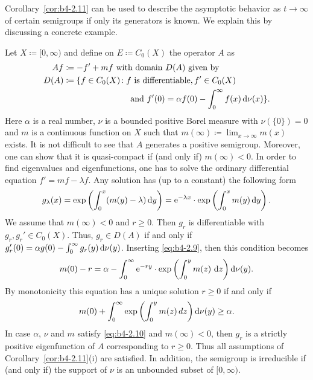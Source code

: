 Corollary~\ref{cor:b4-2.11} can be used to describe the asymptotic behavior as $t \to \infty$ of certain semigroups if only its generators is known. 
We explain this by discussing a concrete example.
\begin{example}\label{ex:b4-2.12}
%
	Let $X  \coloneq  [0,\infty)$ and define on $E  \coloneq  C_{0}(X)$ the operator $A$ as
	\begin{equation}\label{eq:b4-2.8}
		\begin{aligned}
		Af & \coloneq -f' + mf \text{ with domain } D(A) \text{ given by}	\\
		D(A) & \coloneq  \{f \in C_{0}(X) \colon f \text{ is differentiable}, f' \in C_{0}(X)\\
		& \phantom{aaaaaaaaaaaaaaa} \text{and } f'(0) = \alpha f(0) - \int_0^{\infty} f(x) \mathop{}\!\mathrm{d}{\nu}(x)
 \} \text{.}
		\end{aligned}
	\end{equation}
Here $\alpha$ is a real number, $\nu$ is a bounded positive Borel measure with $\nu(\{0\}) = 0$ and $m$ is a continuous function on $X$ such that $m(\infty)  \coloneq  \lim_{x \to \infty}m(x)$ exists. 
It is not difficult to see that $A$ generates a positive semigroup. 
Moreover, one can show that it is quasi-compact if (and only if) $m(\infty) < 0$. 
In order to find eigenvalues and eigenfunctions, one has to solve the ordinary differential equation $f' = mf - \lambda f$. 
Any solution has (up to a constant) the following form
\begin{equation}\label{eq:b4-2.9}
	g_{\lambda}(x) = \exp\left(\int_0^x(m(y) - \lambda)\mathop{}\!\mathrm{d}{y} \right) = \mathrm{e}^{-\lambda x} \cdot \exp\left(\int_0^x m(y) \mathop{}\!\mathrm{d}{y} \right) .
\end{equation}
We assume that $m(\infty) < 0$ and $r \geq 0$. 
Then $g_r$ is differentiable with $g_r, g_r' \in C_{0}(X)$. 
Thus, $g_r \in D(A)$ if and only if $g_r'(0) = \alpha g(0) - \int_0^{\infty} g_r(y) \mathop{}\!\mathrm{d}{\nu}(y)$. 
Inserting \eqref{eq:b4-2.9}, then this condition becomes
\[
m(0) - r = \alpha - \int_0^{\infty} \mathrm{e}^{-ry} \cdot \exp\left(\int_{0}^{y}  m(z) \,\mathop{}\!\mathrm{d}{z}\right)\mathop{}\!\mathrm{d}{\nu}(y) .
\]
By monotonicity this equation has a unique solution $r \geq 0$ if and only if
\begin{equation}\label{eq:b4-2.10}
	m(0) + \int_0^{\infty} \exp\left(\int_0^y m(z) \, dz\right)\mathop{}\!\mathrm{d}{\nu}(y) \geq \alpha .
\end{equation}
In case $\alpha$, $\nu$ and $m$ satisfy \eqref{eq:b4-2.10} and $m(\infty) < 0$, then $g_r$ is a strictly positive eigenfunction of $A$ corresponding to $r \geq 0$. 
Thus all assumptions of Corollary~\ref{cor:b4-2.11}(i) are satisfied. 
In addition, the semigroup is irreducible if (and only if) the support of $\nu$ is an unbounded subset of $[0,\infty)$.
\end{example}

